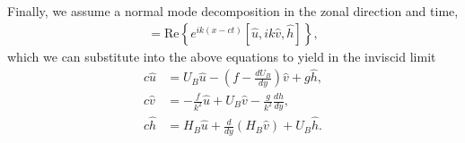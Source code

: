 \documentclass[11pt]{article}
\begin{document}
Finally, we assume a normal mode decomposition in the zonal direction and time,
\begin{align}
[u, v, h] = \mbox{Re}\left\{ e^{ik(x - c t)} [\hat u, ik \hat v, \hat h] \right\},
\end{align}
which we can substitute into the above equations to yield in the inviscid limit
\begin{align*}
c \hat u  &  = U_B \hat u - (f - \frac{dU_B}{dy}) \hat v + g \hat h, \\
c \hat v  &  =- \frac{f}{k^2} \hat u + U_B \hat v -\frac{ g}{k^2} \frac{d h}{d y}, \\
c \hat h  &=   H_B \hat u  +  \frac{d}{d y}\left(H_B \hat v\right) +  U_B \hat h.
\end{align*}
\end{document}
